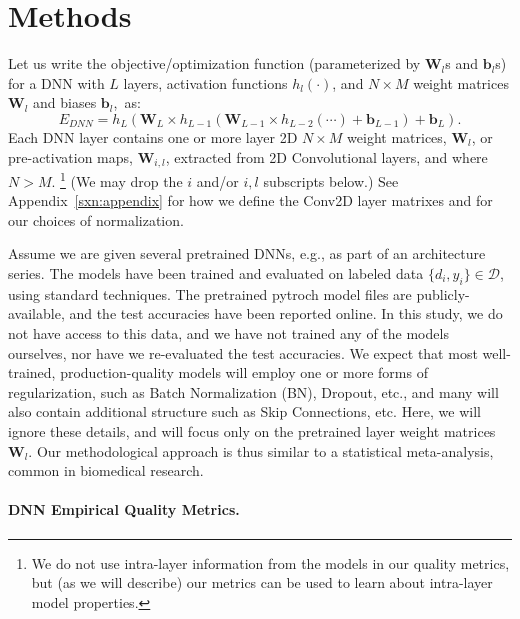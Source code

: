 \section{Methods}
\label{sxn:methods}


Let us write the objective/optimization function (parameterized by $\mathbf{W}_{l}$s and $\mathbf{b}_{l}$s) for a DNN with $L$ layers, activation functions $h_{l}(\cdot)$, and $N\times M$ weight matrices $\mathbf{W}_{l}$ and biases $\mathbf{b}_{l}$,~as:
\begin{equation}
E_{DNN}=h_{L}(\mathbf{W}_{L}\times h_{L-1}(\mathbf{W}_{L-1}\times h_{L-2}(\cdots)+\mathbf{b}_{L-1})+\mathbf{b}_{L})  .
\label{eqn:dnn_energy}
\end{equation}
Each DNN layer contains one or more layer 2D  $N\times M$ weight matrices, $\mathbf{W}_{l}$, or pre-activation maps, $\mathbf{W}_{i,l}$, extracted from 2D Convolutional layers, and where $N > M$.%
\footnote{We do not use intra-layer information from the models in our quality metrics, but (as we will describe) our metrics can be used to learn about intra-layer model properties.}
(We may drop the $i$ and/or $i,l$ subscripts below.)
See Appendix~\ref{sxn:appendix} for how we define the Conv2D layer matrixes and for our choices of normalization. 

Assume we are given several pretrained DNNs, e.g., as part of an architecture series.
The models have been trained and evaluated on labeled data $\{d_{i},y_{i}\}\in\mathcal{D}$, using standard techniques.  
The pretrained pytroch model files are publicly-available, and the test accuracies have been reported online.  
In this study, we do not have access to this data, and we have not trained any of the models ourselves,
nor have we re-evaluated the test accuracies.
We expect that most well-trained, production-quality models will employ one or more forms of regularization, such as Batch Normalization (BN), Dropout, etc., and many will also contain additional structure such as Skip Connections, etc. 
Here, we will ignore these details, and will focus only on the pretrained layer weight matrices $\mathbf{W}_{l}$.
Our methodological approach is thus similar to a statistical meta-analysis, common in biomedical research.


\paragraph{DNN Empirical Quality Metrics.}

